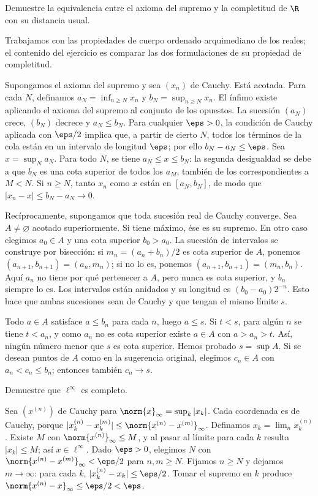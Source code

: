 \begin{ejercicio}
Demuestre la equivalencia entre el axioma del supremo y la completitud de $\R$ con su distancia usual.
\end{ejercicio}
\begin{solucion}
Trabajamos con las propiedades de cuerpo ordenado arquimediano de los reales; el contenido del ejercicio es comparar las dos formulaciones de su propiedad de completitud.

Supongamos el axioma del supremo y sea $(x_n)$ de Cauchy. Está acotada. Para cada $N$, definamos $a_N=\inf_{n\geq N}x_n$ y $b_N=\sup_{n\geq N}x_n$. El ínfimo existe aplicando el axioma del supremo al conjunto de los opuestos. La sucesión $(a_N)$ crece, $(b_N)$ decrece y $a_N\leq b_N$. Para cualquier $\eps>0$, la condición de Cauchy aplicada con $\eps/2$ implica que, a partir de cierto $N$, todos los términos de la cola están en un intervalo de longitud $\eps$; por ello $b_N-a_N\leq\eps$. Sea $x=\sup_Na_N$. Para todo $N$, se tiene $a_N\leq x\leq b_N$: la segunda desigualdad se debe a que $b_N$ es una cota superior de todos los $a_M$, también de los correspondientes a $M<N$. Si $n\geq N$, tanto $x_n$ como $x$ están en $[a_N,b_N]$, de modo que $|x_n-x|\leq b_N-a_N\to0$.

Recíprocamente, supongamos que toda sucesión real de Cauchy converge. Sea $A\ne\varnothing$ acotado superiormente. Si tiene máximo, ése es su supremo. En otro caso elegimos $a_0\in A$ y una cota superior $b_0>a_0$. La sucesión de intervalos se construye por bisección: si $m_n=(a_n+b_n)/2$ es cota superior de $A$, ponemos $(a_{n+1},b_{n+1})=(a_n,m_n)$; si no lo es, ponemos $(a_{n+1},b_{n+1})=(m_n,b_n)$. Aquí $a_n$ no tiene por qué pertenecer a $A$, pero nunca es cota superior, y $b_n$ siempre lo es. Los intervalos están anidados y su longitud es $(b_0-a_0)2^{-n}$. Esto hace que ambas sucesiones sean de Cauchy y que tengan el mismo límite $s$.

Todo $a\in A$ satisface $a\leq b_n$ para cada $n$, luego $a\leq s$. Si $t<s$, para algún $n$ se tiene $t<a_n$, y como $a_n$ no es cota superior existe $a\in A$ con $a>a_n>t$. Así, ningún número menor que $s$ es cota superior. Hemos probado $s=\sup A$. Si se desean puntos de $A$ como en la sugerencia original, elegimos $c_n\in A$ con $a_n<c_n\leq b_n$; entonces también $c_n\to s$.
\end{solucion}

\begin{ejercicio}
Demuestre que $\ell^\infty$ es completo.
\end{ejercicio}
\begin{solucion}
Sea $(x^{(n)})$ de Cauchy para $\norm{x}_\infty=\sup_k|x_k|$. Cada coordenada es de Cauchy, porque $|x^{(n)}_k-x^{(m)}_k|\leq\norm{x^{(n)}-x^{(m)}}_\infty$. Definamos $x_k=\lim_nx^{(n)}_k$. Existe $M$ con $\norm{x^{(n)}}_\infty\leq M$, y al pasar al límite para cada $k$ resulta $|x_k|\leq M$; así $x\in\ell^\infty$. Dado $\eps>0$, elegimos $N$ con $\norm{x^{(n)}-x^{(m)}}_\infty<\eps/2$ para $n,m\geq N$. Fijamos $n\geq N$ y dejamos $m\to\infty$: para cada $k$, $|x^{(n)}_k-x_k|\leq\eps/2$. Tomar el supremo en $k$ produce $\norm{x^{(n)}-x}_\infty\leq\eps/2<\eps$.
\end{solucion}

